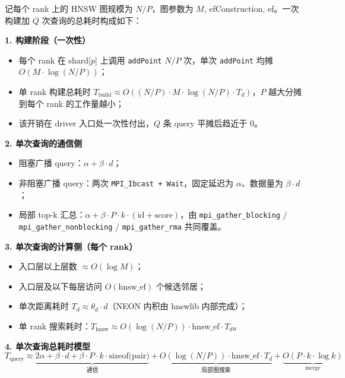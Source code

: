 \documentclass[a4paper]{article}
\begin{document}
记每个 rank 上的 HNSW 图规模为 $N/P$，图参数为 $M$, efConstruction, ef。一次构建加 $Q$ 次查询的总耗时构成如下：

\textbf{1. 构建阶段（一次性）}
\begin{itemize}
    \item 每个 rank 在 shard[$p$] 上调用 \texttt{addPoint} $N/P$ 次，单次 \texttt{addPoint} 均摊 $O(M \cdot \log(N/P))$；
    \item 单 rank 构建总耗时 $T_{\text{build}} \approx O((N/P) \cdot M \cdot \log(N/P) \cdot T_d)$，$P$ 越大分摊到每个 rank 的工作量越小；
    \item 该开销在 driver 入口处一次性付出，$Q$ 条 query 平摊后趋近于 0。
\end{itemize}

\textbf{2. 单次查询的通信侧}
\begin{itemize}
    \item 阻塞广播 query：$\alpha + \beta \cdot d$；
    \item 非阻塞广播 query：两次 \texttt{MPI\_Ibcast + Wait}，固定延迟为 $\alpha$、数据量为 $\beta \cdot d$；
    \item 局部 top-k 汇总：$\alpha + \beta \cdot P \cdot k \cdot (\text{id} + \text{score})$，由 \texttt{mpi\_gather\_blocking} / \texttt{mpi\_gather\_nonblocking} / \texttt{mpi\_gather\_rma} 共同覆盖。
\end{itemize}

\textbf{3. 单次查询的计算侧（每个 rank）}
\begin{itemize}
    \item 入口层以上层数 $\approx O(\log M)$；
    \item 入口层及以下每层访问 $O(\text{hnsw\_ef})$ 个候选邻居；
    \item 单次距离耗时 $T_d \approx \theta_d \cdot d$（NEON 内积由 hnswlib 内部完成）；
    \item 单 rank 搜索耗时：$T_{\text{hnsw}} \approx O(\log(N/P)) \cdot \text{hnsw\_ef} \cdot T_d$。
\end{itemize}

\textbf{4. 单次查询总耗时模型}
\begin{equation}
T_{\text{query}} \approx \underbrace{2\alpha + \beta \cdot d + \beta \cdot P \cdot k \cdot \text{sizeof(pair)}}_{\text{通信}} + \underbrace{O(\log(N/P)) \cdot \text{hnsw\_ef} \cdot T_d}_{\text{局部图搜索}} + \underbrace{O(P \cdot k \cdot \log k)}_{\text{merge}}
\end{equation}
\end{document}

